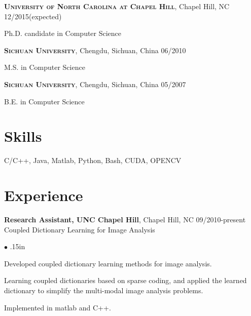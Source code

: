\documentclass[line,margin]{res}
\newenvironment{bullets}{\begin{list}{\tiny$\bullet$}{\topsep 0pt \itemsep -2pt \leftmargin .15in}}{\vspace*{4pt}\end{list}}
\newenvironment{list1}{
  \begin{list}{\ding{113}}{%
      \setlength{\itemsep}{0in}
      \setlength{\parsep}{0in} \setlength{\parskip}{0in}
      \setlength{\topsep}{0in} \setlength{\partopsep}{0in} 
      \setlength{\leftmargin}{0.17in}}}{\end{list}}
\begin{document}
\begin{resume}
\textsc{\textbf{University of North Carolina at Chapel Hill}}, Chapel Hill, NC \hfill{12/2015(expected)}\\
\vspace*{-.15in}
\begin{list1}
\item[] Ph.D. candidate in Computer Science %
\end{list1}
\vspace*{-.15in}
\textsc{\textbf{Sichuan University}}, Chengdu, Sichuan, China \hfill {06/2010} \\
\vspace*{-.15in}
\begin{list1}
\item[] M.S. in Computer Science  %
\end{list1}
\vspace*{-.15in}
\textsc{\textbf{Sichuan University}}, Chengdu, Sichuan, China \hfill{05/2007}\\
\vspace*{-.15in}
\begin{list1}
\item[] B.E. in Computer Science  %
\end{list1}

\section{\sc Skills}
\smallskip

C/C++, Java, Matlab, Python, Bash, CUDA, OPENCV


\vspace{-.05in}
\section{\sc Experience}
\smallskip

\textbf{Research Assistant, UNC Chapel Hill}, Chapel Hill, NC  \hfill      09/2010-present \\
Coupled Dictionary Learning for Image Analysis %
\begin{bullets}
	\item Developed coupled dictionary learning methods for image analysis.
	\item Learning coupled dictionaries based on sparse coding, and applied the learned dictionary to simplify the multi-modal image analysis problems.
	\item Implemented in matlab and C++.
\end{bullets}
\vspace{-.1in}



\end{resume}
\end{document}
